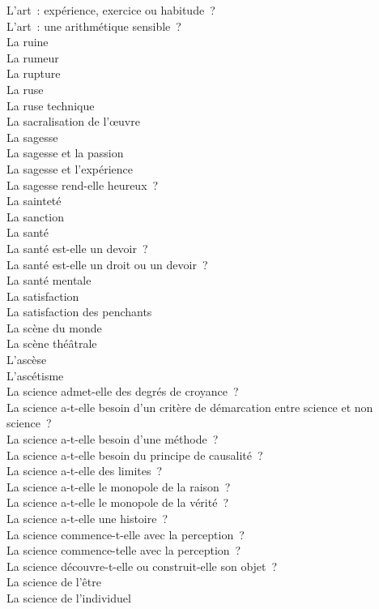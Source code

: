 \documentclass[a4paper,12pt]{article}
\begin{document}
L'art : expérience, exercice ou habitude ? \\
L'art : une arithmétique sensible ? \\
La ruine \\
La rumeur \\
La rupture \\
La ruse \\
La ruse technique \\
La sacralisation de l'œuvre \\
La sagesse \\
La sagesse et la passion \\
La sagesse et l'expérience \\
La sagesse rend-elle heureux ? \\
La sainteté \\
La sanction \\
La santé \\
La santé est-elle un devoir ? \\
La santé est-elle un droit ou un devoir ? \\
La santé mentale \\
La satisfaction \\
La satisfaction des penchants \\
La scène du monde \\
La scène théâtrale \\
L'ascèse \\
L'ascétisme \\
La science admet-elle des degrés de croyance ? \\
La science a-t-elle besoin d'un critère de démarcation entre science et non science ? \\
La science a-t-elle besoin d'une méthode ? \\
La science a-t-elle besoin du principe de causalité ? \\
La science a-t-elle des limites ? \\
La science a-t-elle le monopole de la raison ? \\
La science a-t-elle le monopole de la vérité ? \\
La science a-t-elle une histoire ? \\
La science commence-t-elle avec la perception ? \\
La science commence-telle avec la perception ? \\
La science découvre-t-elle ou construit-elle son objet ? \\
La science de l'être \\
La science de l'individuel \\
\end{document}
